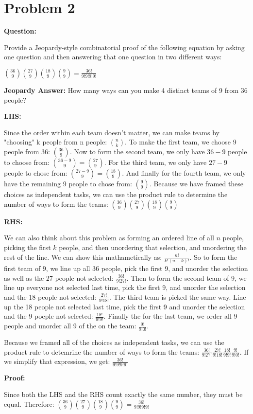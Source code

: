 \documentclass[11pt]{article}
\begin{document}
\section*{Problem 2}

\textbf{Question: }

Provide a Jeopardy-style combinatorial proof of the following equation by asking one question and then answering that one question in two different ways:

$\binom{36}{9} \binom{27}{9} \binom{18}{9} \binom{9}{9} = \frac{36!}{9!9!9!9!}$

\textbf{Jeopardy Answer:}
How many ways can you make 4 distinct teams of 9 from 36 people?

\textbf{LHS:}

Since the order within each team doesn't matter, we can make teams by "choosing" k people from n people: $\binom{n}{k}$. To make the first team, we choose 9 people from 36: $\binom{36}{9}$. Now to form the second team, we only have $36-9$ people to choose from: $\binom{36-9}{9} = \binom{27}{9}$. For the third team, we only have $27 - 9$ people to chose from: $\binom{27-9}{9}=\binom{18}{9}$. And finally for the fourth team, we only have the remaining 9 people to chose from: $\binom{9}{9}$. Because we have framed these choices as independent tasks, we can use the product rule to determine the number of ways to form the teams: $\binom{36}{9} \binom{27}{9} \binom{18}{9} \binom{9}{9}$

\textbf{RHS:}

We can also think about this problem as forming an ordered line of all $n$ people, picking the first $k$ people, and then unordering that selection, and unordering the rest of the line. We can show this mathametically as: $\frac{n!}{k!(n-k)!}$. So to form the first team of 9, we line up all 36 people, pick the first 9, and unorder the selection as well as the 27 people not selected: $\frac{36!}{9!27!}$. Then to form the second team of 9, we line up everyone not selected last time, pick the first 9, and unorder the selection and the 18 people not selected: $\frac{27!}{9!18!}$. The third team is picked the same way. Line up the 18 people not selected last time, pick the first 9 and unorder the selection and the 9 poeple not selected: $\frac{18!}{9!9!}$. Finally the for the last team, we order all 9 people and unorder all 9 of the on the team: $\frac{9!}{9!0!}$.

Because we framed all of the choices as independent tasks, we can use the product rule to detemrine the number of ways to form the teams: $\frac{36!}{9!27!} \frac{27!}{9!18!} \frac{18!}{9!9!} \frac{9!}{9!0!}$. If we simplify that expression, we get: $\frac{36!}{9!9!9!9!}$

\textbf{Proof:}

Since both the LHS and the RHS count exactly the same number, they must be equal. Therefore:
$\binom{36}{9} \binom{27}{9} \binom{18}{9} \binom{9}{9} = \frac{36!}{9!9!9!9!}$
\end{document}
